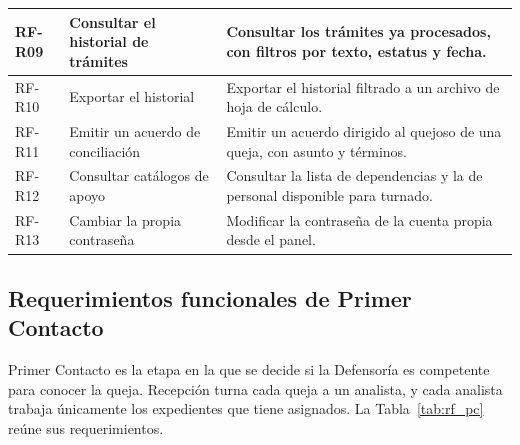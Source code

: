 \begin{longtable}{|L{1.7cm}|L{4.0cm}|L{9.9cm}|}
		RF-R09 & Consultar el historial de trámites & Consultar los trámites ya procesados, con
		filtros por texto, estatus y fecha. \\ \hline
	
		RF-R10 & Exportar el historial & Exportar el historial filtrado a un archivo de hoja de
		cálculo. \\ \hline
	
		RF-R11 & Emitir un acuerdo de conciliación & Emitir un acuerdo dirigido al quejoso de una
		queja, con asunto y términos. \\ \hline
	
		RF-R12 & Consultar catálogos de apoyo & Consultar la lista de dependencias y la de personal
		disponible para turnado. \\ \hline
	
		RF-R13 & Cambiar la propia contraseña & Modificar la contraseña de la cuenta propia desde el
		panel. \\ \hline
	\end{longtable}
	
	\normalsize
	
	\subsection{Requerimientos funcionales de Primer Contacto}
	Primer Contacto es la etapa en la que se decide si la Defensoría es competente para conocer la
	queja. Recepción turna cada queja a un analista, y cada analista trabaja únicamente los
	expedientes que tiene asignados. La Tabla~\ref{tab:rf_pc} reúne sus requerimientos.

	\small
	\renewcommand{\arraystretch}{1.2}

